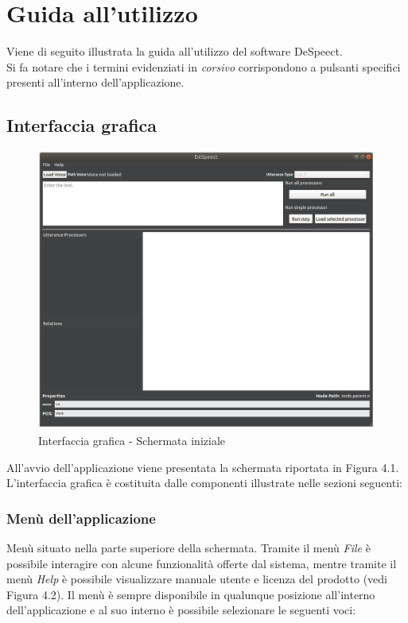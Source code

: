 \documentclass[openany,12pt,a4paper]{report}
\begin{document}
	\chapter{Guida all'utilizzo}
	Viene di seguito illustrata la guida all'utilizzo del software DeSpeect. \\
	Si fa notare che i termini evidenziati in \textit{corsivo} corrispondono a pulsanti specifici presenti all'interno dell'applicazione.
	
	\section{Interfaccia grafica}
	
	\begin{figure}[H]
		
		\centering
		
		\includegraphics[scale=0.45]{./img/avvio}
		
		\caption{Interfaccia grafica - Schermata iniziale}
	
	\end{figure}

	All'avvio dell'applicazione viene presentata la schermata riportata in Figura 4.1. L'interfaccia grafica è costituita dalle componenti illustrate nelle sezioni seguenti:
 	
 	\subsection{Menù dell'applicazione}
 	Menù situato nella parte superiore della schermata. Tramite il menù \textit{File} è possibile interagire con alcune funzionalità offerte dal sistema, mentre tramite il menù \textit{Help} è possibile visualizzare manuale utente e licenza del prodotto (vedi Figura 4.2). Il menù è sempre disponibile in qualunque posizione all'interno dell'applicazione e al suo interno è possibile selezionare le seguenti voci:
 	
\end{document}
